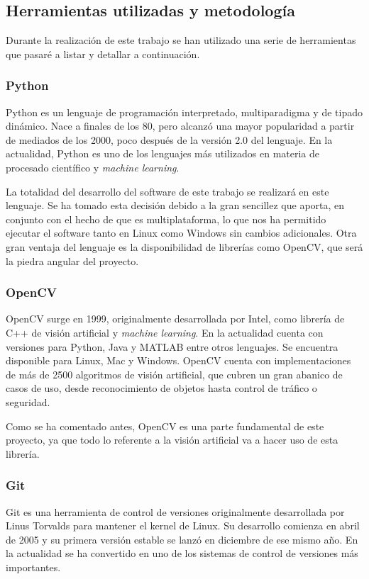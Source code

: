 \subsection{Herramientas utilizadas y metodología}
Durante la realización de este trabajo se han utilizado una serie de herramientas que pasaré a listar y detallar a continuación.

\subsubsection*{Python}
Python es un lenguaje de programación interpretado, multiparadigma y de tipado dinámico. Nace a finales de los 80, pero alcanzó una mayor popularidad a partir de mediados de los 2000, poco después de la versión 2.0 del lenguaje. En la actualidad, Python es uno de los lenguajes más utilizados en materia de procesado científico y \textit{machine learning}.

La totalidad del desarrollo del software de este trabajo se realizará en este lenguaje. Se ha tomado esta decisión debido a la gran sencillez que aporta, en conjunto con el hecho de que es multiplataforma, lo que nos ha permitido ejecutar el software tanto en Linux como Windows sin cambios adicionales. Otra gran ventaja del lenguaje es la disponibilidad de librerías como OpenCV, que será la piedra angular del proyecto. 

\subsubsection*{OpenCV}
OpenCV surge en 1999, originalmente desarrollada por Intel, como librería de C++ de visión artificial y \textit{machine learning}. En la actualidad cuenta con versiones para Python, Java y MATLAB entre otros lenguajes. Se encuentra disponible para Linux, Mac y Windows. OpenCV cuenta con implementaciones de más de 2500 algoritmos de visión artificial, que cubren un gran abanico de casos de uso, desde reconocimiento de objetos hasta control de tráfico o seguridad.

Como se ha comentado antes, OpenCV es una parte fundamental de este proyecto, ya que todo lo referente a la visión artificial va a hacer uso de esta librería.

\subsubsection*{Git}
Git es una herramienta de control de versiones originalmente desarrollada por Linus Torvalds para mantener el kernel de Linux. Su desarrollo comienza en abril de 2005 y su primera versión estable se lanzó en diciembre de ese mismo año. En la actualidad se ha convertido en uno de los sistemas de control de versiones más importantes.

